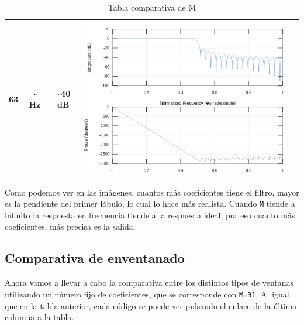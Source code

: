 \documentclass[11pt,a4paper]{article}
\begin{document}
\begin{table}[H]
\begin{tabular}{|c|c|c|c|c|}
63 & \textasciitilde{} Hz            & \textasciitilde{}40 dB                       & \includegraphics[scale=0.3]{img/5.png} & \color{deepred}\nameref{code4}\color{black} \\ \hline
\end{tabular}
\caption{Tabla comparativa de M}
\end{table}

Como podemos ver en las imágenes, cuantos más coeficientes tiene el filtro, mayor es la pendiente del primer lóbulo, lo cual lo hace más realista. Cuando \texttt{M} tiende a infinito la respuesta en frecuencia tiende a la respuesta ideal, por eso cuanto más coeficientes, más precisa es la salida.

\subsection{Comparativa de enventanado}

Ahora vamos a llevar a cabo la comparativa entre los distintos tipos de ventanas utilizando un número fijo de coeficientes, que se corresponde con \texttt{M=31}. Al igual que en la tabla anterior, cada código se puede ver pulsando el enlace de la última columna a la tabla.
\end{document}
